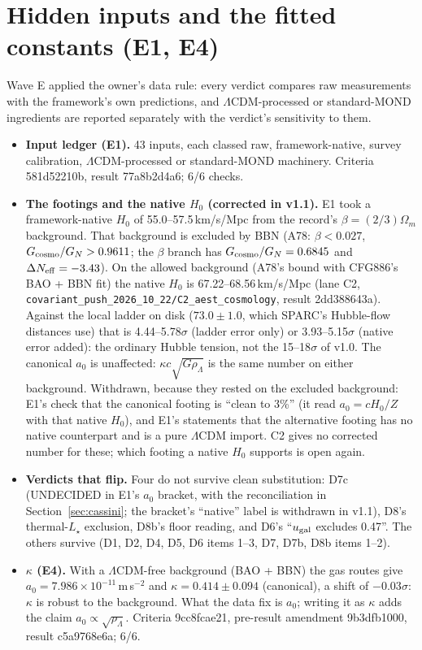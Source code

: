\documentclass[10pt]{article}
\begin{document}
\section{Hidden inputs and the fitted constants (E1, E4)}
Wave E applied the owner's data rule: every verdict compares raw measurements with the framework's own predictions, and $\Lambda$CDM-processed or standard-MOND ingredients are reported separately with the verdict's sensitivity to them.
\begin{itemize}
\item \textbf{Input ledger (E1).} 43 inputs, each classed raw, framework-native, survey calibration, $\Lambda$CDM-processed or standard-MOND machinery. Criteria 581d52210b, result 77a8b2d4a6; 6/6 checks.
\item \textbf{The footings and the native $H_0$ (corrected in v1.1).} E1 took a framework-native $H_0$ of 55.0--57.5\,km/s/Mpc from the record's $\beta=(2/3)\Omega_m$ background. That background is excluded by BBN (A78: $\beta<0.027$, $G_{\rm cosmo}/G_N>0.9611$; the $\beta$ branch has $G_{\rm cosmo}/G_N=0.6845$ and $\Delta N_{\rm eff}=-3.43$). On the allowed background (A78's bound with CFG886's BAO + BBN fit) the native $H_0$ is 67.22--68.56\,km/s/Mpc (lane C2, \texttt{covariant\_push\_2026\_10\_22/C2\_aest\_cosmology}, result 2dd388643a). Against the local ladder on disk ($73.0\pm1.0$, which SPARC's Hubble-flow distances use) that is 4.44--5.78$\sigma$ (ladder error only) or 3.93--5.15$\sigma$ (native error added): the ordinary Hubble tension, not the 15--18$\sigma$ of v1.0. The canonical $a_0$ is unaffected: $\kappa c\sqrt{G\rho_\Lambda}$ is the same number on either background. Withdrawn, because they rested on the excluded background: E1's check that the canonical footing is ``clean to 3\%'' (it read $a_0=cH_0/Z$ with that native $H_0$), and E1's statements that the alternative footing has no native counterpart and is a pure $\Lambda$CDM import. C2 gives no corrected number for these; which footing a native $H_0$ supports is open again.
\item \textbf{Verdicts that flip.} Four do not survive clean substitution: D7c (UNDECIDED in E1's $a_0$ bracket, with the reconciliation in Section~\ref{sec:cassini}; the bracket's ``native'' label is withdrawn in v1.1), D8's thermal-$L_\star$ exclusion, D8b's floor reading, and D6's ``$u_{\rm gal}$ excludes 0.47''. The others survive (D1, D2, D4, D5, D6 items 1--3, D7, D7b, D8b items 1--2).
\item \textbf{$\kappa$ (E4).} With a $\Lambda$CDM-free background (BAO + BBN) the gas routes give $a_0=7.986\times10^{-11}$\,m\,s$^{-2}$ and $\kappa=0.414\pm0.094$ (canonical), a shift of $-0.03\sigma$: $\kappa$ is robust to the background. What the data fix is $a_0$; writing it as $\kappa$ adds the claim $a_0\propto\sqrt{\rho_\Lambda}$. Criteria 9cc8fcae21, pre-result amendment 9b3dfb1000, result c5a9768e6a; 6/6.

\end{itemize}
\end{document}
